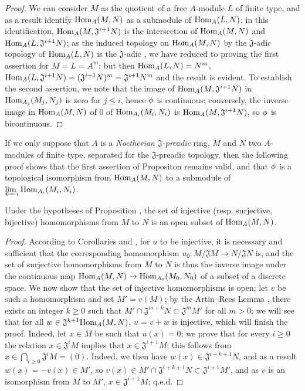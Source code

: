 \begin{proof}
We can consider $M$ as the quotient of a free $A$-module $L$ of finite type, and as a result identify ${\mathop{\mathrm{Hom}}\nolimits}_A(M,N)$ as a submodule of ${\mathop{\mathrm{Hom}}\nolimits}_A(L,N)$; in this identification,
${\mathop{\mathrm{Hom}}\nolimits}_A(M,\mathfrak{J}^{i+1}N)$ is the intersection of ${\mathop{\mathrm{Hom}}\nolimits}_A(M,N)$ and
${\mathop{\mathrm{Hom}}\nolimits}_A(L,\mathfrak{J}^{i+1}N)$; as the induced topology on ${\mathop{\mathrm{Hom}}\nolimits}_A(M,N)$ by the $\mathfrak{J}$-adic
topology of ${\mathop{\mathrm{Hom}}\nolimits}_A(L,N)$ is the $\mathfrak{J}$-adic , we have
reduced to proving the first assertion
for $M=L=A^m$; but then ${\mathop{\mathrm{Hom}}\nolimits}_A(L,N)=N^m$,
${\mathop{\mathrm{Hom}}\nolimits}_A(L,\mathfrak{J}^{i+1}N)=(\mathfrak{J}^{i+1}N)^m=\mathfrak{J}^{i+1}N^m$ and the result is
evident. To establish the second assertion, we note that the image of ${\mathop{\mathrm{Hom}}\nolimits}_A(M,\mathfrak{J}^{i+1}N)$
in ${\mathop{\mathrm{Hom}}\nolimits}_{A_j}(M_j,N_j)$ is zero for $j\leq i$, hence $\phi$ is continuous; conversely, the
inverse image in ${\mathop{\mathrm{Hom}}\nolimits}_A(M,N)$ of $0$ of ${\mathop{\mathrm{Hom}}\nolimits}_{A_i}(M_i,N_i)$ is ${\mathop{\mathrm{Hom}}\nolimits}_A(M,\mathfrak{J}^{i+1}N)$,
so $\phi$ is bicontinuous.
\end{proof}

If we only suppose that $A$ is a \emph{Noetherian $\mathfrak{J}$-preadic} ring, $M$ and $N$ two
$A$-modules of finite type, separated for the $\mathfrak{J}$-preadic topology, then the
following proof shows that the first assertion of Propositon  remains
valid, and that $\phi$ is a topological isomorphism from ${\mathop{\mathrm{Hom}}\nolimits}_A(M,N)$ to a submodule of
$\varprojlim_i{\mathop{\mathrm{Hom}}\nolimits}_{A_i}(M_i,N_i)$.

\begin{proposition}[7.8.3]
\label{0.7.8.3}
Under the hypotheses of Proposition , the set of injective
(resp. surjective, bijective) homomorphisms from $M$ to $N$ is an open subset of ${\mathop{\mathrm{Hom}}\nolimits}_A(M,N)$.
\end{proposition}

\begin{proof}
According to Corollaries  and , for
$u$ to be injective, it is necessary and sufficient that the corresponding homomorphism
$u_0:M/\mathfrak{J}M\to N/\mathfrak{J}N$ is, and the set of surjective homomorphisms from $M$ to $N$
is thus the inverse image under the continuous map $\Hom_A(M,N)\to\Hom_{A_0}(M_0,N_0)$ of a subset
of a discrete space. We now show that the set of injective homomorphisms is open; let $v$ be such a
homomorphism and set $M'=v(M)$; by the Artin--Rees Lemma , there exists
an integer $k\geq 0$ such that $M'\cap\mathfrak{J}^{m+k}N\subset\mathfrak{J}^m M'$ for all
$m>0$; we will see that for all $w\in\mathfrak{J}^{k+1}{\mathop{\mathrm{Hom}}\nolimits}_A(M,N)$, $u=v+w$ is injective, which
will finish the proof. Indeed, let $x\in M$ be such that $u(x)=0$; we prove that for every
$i\geq 0$ the relation $x\in\mathfrak{J}^i M$ implies that $x\in\mathfrak{J}^{i+1}M$; this
follows from $x\in\bigcap_{i\geq 0}\mathfrak{J}^i M=(0)$. Indeed, we then have
$w(x)\in\mathfrak{J}^{i+k+1}N$, and as a result $w(x)=-v(x)\in M'$, so
$v(x)\in M'\cap\mathfrak{J}^{i+k+1}N\subset\mathfrak{J}^{i+1}M'$, and as $v$ is an isomorphism from
$M$ to $M'$, $x\in\mathfrak{J}^{i+1}M$; q.e.d.
\end{proof}

